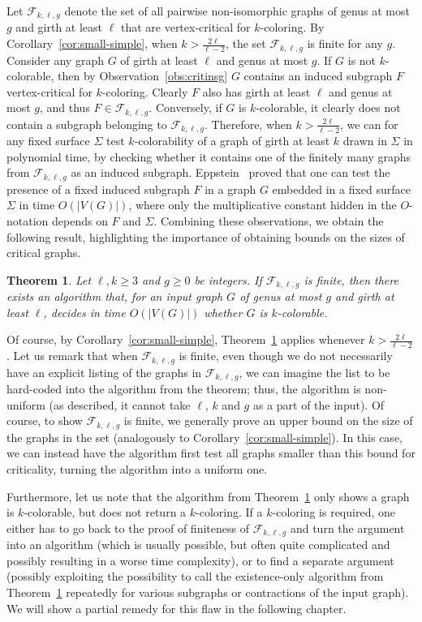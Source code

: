 \documentclass[12pt,twoside,openright,a4paper]{book}
\newtheorem{theorem}{Theorem}[chapter]
\newcommand{\FF}{\mathcal{F}}
\begin{document}
Let $\FF_{k,\ell,g}$ denote the set of all pairwise non-isomorphic graphs of genus at most $g$ and girth at least $\ell$
that are vertex-critical for $k$-coloring.  By Corollary~\ref{cor:small-simple}, when $k>\tfrac{2\ell}{\ell-2}$,
the set $\FF_{k,\ell,g}$ is finite for any $g$.  Consider any graph $G$ of girth at least $\ell$ and genus at most $g$.  If $G$ is not
$k$-colorable, then by Observation~\ref{obs:critinsg} $G$ contains an induced subgraph $F$ vertex-critical for $k$-coloring.
Clearly $F$ also has girth at least $\ell$ and genus at most $g$, and thus $F\in\FF_{k,\ell,g}$.  Conversely, if $G$ is $k$-colorable,
it clearly does not contain a subgraph belonging to $\FF_{k,\ell,g}$.  Therefore, when $k>\tfrac{2\ell}{\ell-2}$,
we can for any fixed surface $\Sigma$ test $k$-colorability of a graph of girth at least $k$ drawn in $\Sigma$ in polynomial
time, by checking whether it contains one of the finitely many graphs from $\FF_{k,\ell,g}$ as an induced subgraph.
Eppstein~\cite{eppstein00} proved that one can test the presence of a fixed induced subgraph $F$ in a graph $G$ embedded in a fixed surface $\Sigma$
in time $O(|V(G)|)$, where only the multiplicative constant hidden in the $O$-notation depends on $F$ and $\Sigma$.
Combining these observations, we obtain the following result, highlighting the importance of obtaining bounds on the sizes of critical graphs.
\begin{theorem}\label{thm:crittoalg}
Let $\ell,k\ge 3$ and $g\ge 0$ be integers.  If $\FF_{k,\ell,g}$ is finite, then there exists an algorithm that,
for an input graph $G$ of genus at most $g$ and girth at least $\ell$, decides in time $O(|V(G)|)$ whether $G$ is $k$-colorable.
\end{theorem}
Of course, by Corollary~\ref{cor:small-simple}, Theorem~\ref{thm:crittoalg} applies whenever $k>\tfrac{2\ell}{\ell-2}$.
Let us remark that when $\FF_{k,\ell,g}$ is finite, even though we do not necessarily have an explicit listing of the graphs in $\FF_{k,\ell,g}$,
we can imagine the list to be hard-coded into the algorithm from the theorem; thus, the algorithm is non-uniform (as described, it cannot
take $\ell$, $k$ and $g$ as a part of the input).  Of course, to show $\FF_{k,\ell,g}$ is finite, we generally prove an
upper bound on the size of the graphs in the set (analogously to Corollary~\ref{cor:small-simple}).  In this case, we can
instead have the algorithm first test all graphs smaller than this bound for criticality, turning the algorithm into a uniform one.

Furthermore, let us note that the algorithm from Theorem~\ref{thm:crittoalg} only shows a graph is $k$-colorable, but does not return
a $k$-coloring.  If a $k$-coloring is required, one either has to go back to the proof of finiteness of $\FF_{k,\ell,g}$ and turn
the argument into an algorithm (which is usually possible, but often quite complicated and possibly resulting in a worse time complexity),
or to find a separate argument (possibly exploiting the possibility to call the existence-only algorithm from Theorem~\ref{thm:crittoalg}
repeatedly for various subgraphs or contractions of the input graph).  We will show a partial remedy for this flaw in the following chapter.
\end{document}

